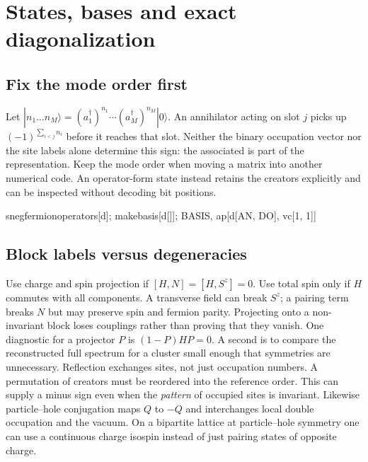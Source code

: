 \chapter{States, bases and exact diagonalization}
\section{Fix the mode order first}
Let $|n_1\ldots n_M\rangle=(a^\dagger_1)^{n_1}\cdots
(a^\dagger_M)^{n_M}|0\rangle$. An annihilator acting on slot $j$
picks up $(-1)^{\sum_{i<j}n_i}$ before it reaches that slot. Neither
the binary occupation vector nor the site labels alone determine this
sign: the associated  is part of the representation. Keep
the mode order when moving a matrix into another numerical code.
An operator-form state instead retains the creators explicitly and
can be inspected without decoding bit positions.
\begin{wl}
snegfermionoperators[d];
makebasis[{d[]}];
{BASIS, ap[d[AN, DO], vc[1, 1]]}
\end{wl}

\section{Block labels versus degeneracies}
Use charge and spin projection if $[H,N]=[H,S^z]=0$. Use total spin
only if $H$ commutes with all components. A transverse field can break
$S^z$; a pairing term breaks $N$ but may preserve spin and fermion
parity. Projecting onto a non-invariant block loses couplings rather
than proving that they vanish. One diagnostic for a projector $P$ is
$(1-P)HP=0$. A second is to compare the reconstructed full spectrum
for a cluster small enough that symmetries are unnecessary.
Reflection exchanges sites, not just occupation numbers. A permutation
of creators must be reordered into the reference order. This can supply
a minus sign even when the \emph{pattern} of occupied sites is invariant.
Likewise particle--hole conjugation maps $Q$ to $-Q$ and interchanges
local double occupation and the vacuum. On a bipartite lattice at
particle--hole symmetry one can use a continuous charge isospin
instead of just pairing states of opposite charge.

